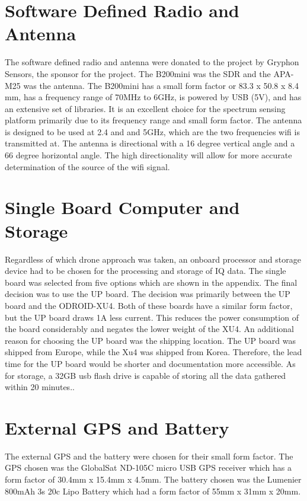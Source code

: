 \section{Software Defined Radio and Antenna}
The software defined radio and antenna were donated to the project by Gryphon Sensors, the sponsor for the project. The B200mini was the SDR and the APA-M25 was the antenna. The B200mini has a small form factor or 83.3 x 50.8 x 8.4 mm, has a frequency range of 70MHz to 6GHz, is powered by USB (5V), and has an extensive set of libraries. It is an excellent choice for the spectrum sensing platform primarily due to its frequency range and small form factor. The antenna is designed to be used at 2.4 and and 5GHz, which are the two frequencies wifi is transmitted at. The antenna is directional with a 16 degree vertical angle and a 66 degree horizontal angle. The high directionality will allow for more accurate determination of the source of the wifi signal.

\section{Single Board Computer and Storage}
Regardless of which drone approach was taken, an onboard processor and storage device had to be chosen for the processing and storage of IQ data. The single board was selected from five options which are shown in the appendix. The final decision was to use the UP board. The decision was primarily between the UP board and the ODROID-XU4. Both of these boards have a similar form factor, but the UP board draws 1A less current. This reduces the power consumption of the board considerably and negates the lower weight of the XU4. An additional reason for choosing the UP board was the shipping location. The UP board was shipped from Europe, while the Xu4 was shipped from Korea. Therefore, the lead time for the UP board would be shorter and documentation more accessible. As for storage, a 32GB usb flash drive is capable of storing all the data gathered within 20 minutes..

\section{External GPS and Battery}
The external GPS and the battery were chosen for their small form factor. The GPS chosen was the GlobalSat ND-105C micro USB GPS receiver which has a form factor of 30.4mm x 15.4mm x 4.5mm. The battery chosen was the Lumenier 800mAh 3s 20c Lipo Battery which had a form factor of 55mm x 31mm x 20mm.

